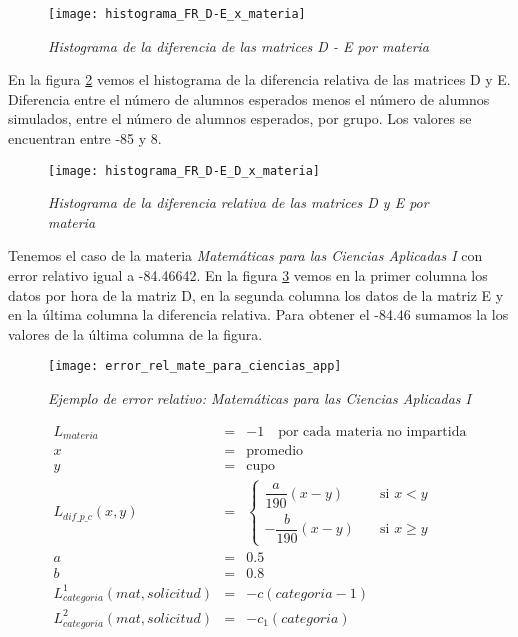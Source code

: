 \begin{figure}[H]
\centering
\texttt{[image: histograma\_FR\_D-E\_x\_materia]} %
\caption{\textit{Histograma de la diferencia de las matrices D - E por materia}}\label{dif_D_E_materia}
\end{figure}


En la figura \ref{difRel_D_E_materia} vemos el histograma de la diferencia relativa de las matrices D y E. Diferencia entre el número de alumnos esperados menos el número de alumnos simulados, entre el número de alumnos esperados, por grupo. Los valores se encuentran entre -85 y 8.

\begin{figure}[H]
\centering
\texttt{[image: histograma\_FR\_D-E\_D\_x\_materia]} %
\caption{\textit{Histograma de la diferencia relativa de las matrices D y E por materia}}\label{difRel_D_E_materia}
\end{figure}

Tenemos el caso de la materia \textit{Matemáticas para las Ciencias Aplicadas I} con error relativo igual a -84.46642. En la figura \ref{difRel_mate_ciencias_app} vemos en la primer columna los datos por hora de la matriz D, en la segunda columna los datos de la matriz E y en la última columna la diferencia relativa. Para obtener el -84.46 sumamos la los valores de la última columna de la figura.

\begin{figure}[H]
\centering
\texttt{[image: error\_rel\_mate\_para\_ciencias\_app]} %
\caption{\textit{Ejemplo de error relativo: Matemáticas para las Ciencias Aplicadas I}}\label{difRel_mate_ciencias_app}
\end{figure}






\begin{eqnarray*}
L_{materia} &=& -1 \,\,\,\,\,\,  \text{por cada materia no impartida}\\
x &=& \text{promedio}\\
y &=& \text{cupo}\\
L_{dif\_p\_c} (x,y) &=& \begin{cases}
    \dfrac{a}{190} (x-y)  & \quad \text{si } x<y\\
    - \dfrac{b}{190} (x-y)  & \quad \text{si } x\geqslant y
  \end{cases}\\
a &=& 0.5\\
b &=& 0.8\\
L_{categoria}^{1} (mat,solicitud) &=& -c(categoria - 1)\\
L_{categoria}^{2} (mat,solicitud) &=& -c_{1}(categoria)
\end{eqnarray*}


